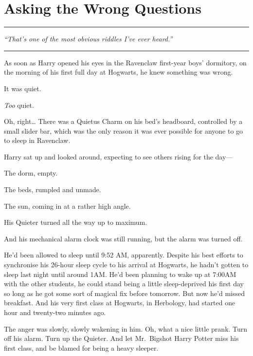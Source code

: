 \chapter{Asking the Wrong Questions}\label{asking-the-wrong-questions}

\begin{center}\rule{3in}{0.4pt}\end{center}

\emph{``That's one of the most obvious riddles I've ever heard.''}

\begin{center}\rule{3in}{0.4pt}\end{center}

As soon as Harry opened his eyes in the Ravenclaw first-year boys'
dormitory, on the morning of his first full day at Hogwarts, he knew
something was wrong.

It was quiet.

\emph{Too} quiet.

Oh, right\ldots{} There was a Quietus Charm on his bed's headboard,
controlled by a small slider bar, which was the only reason it was ever
possible for anyone to go to sleep in Ravenclaw.

Harry sat up and looked around, expecting to see others rising for the
day---

The dorm, empty.

The beds, rumpled and unmade.

The sun, coming in at a rather high angle.

His Quieter turned all the way up to maximum.

And his mechanical alarm clock was still running, but the alarm was
turned off.

He'd been allowed to sleep until 9:52 AM, apparently. Despite his best
efforts to synchronise his 26-hour sleep cycle to his arrival at
Hogwarts, he hadn't gotten to sleep last night until around 1AM. He'd
been planning to wake up at 7:00AM with the other students, he could
stand being a little sleep-deprived his first day so long as he got some
sort of magical fix before tomorrow. But now he'd missed breakfast. And
his very first class at Hogwarts, in Herbology, had started one hour and
twenty-two minutes ago.

The anger was slowly, slowly wakening in him. Oh, what a nice little
prank. Turn off his alarm. Turn up the Quieter. And let Mr.~Bigshot
Harry Potter miss his first class, and be blamed for being a heavy
sleeper.

